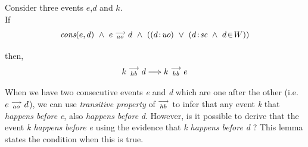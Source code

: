     \begin{lemma} Consider three events $e$,$d$ and $k$. \\
    
        If
            \[
                \cons{e}{d} \ \wedge \ \reln{e}{ao}{d} \ \wedge \
                (
                    (\et{d}{uo}) \ \vee \
                    (\et{d}{sc} \ \wedge \ \event{d}{W})
                )
            \]
            
        then,
            \[
                k\stackrel{\longrightarrow}{_{hb}}d \Longrightarrow k\stackrel{\longrightarrow}{_{hb}}e
            \]
          
        When we have two consecutive events \textit{e} and \textit{d} which are one after the other (i.e. $e\stackrel{\longrightarrow}{_{ao}}d$), we can use \textit{transitive property} of $\stackrel{\longrightarrow}{_{hb}}$ to infer that any event \textit{k} that \textit{happens before} \textit{e}, also \textit{happens before} \textit{d}. However, is it possible to derive that the event \textit{k happens before e} using the evidence that \textit{k happens before d} ? This lemma states the condition when this is true.
        
    \end{lemma}
    
